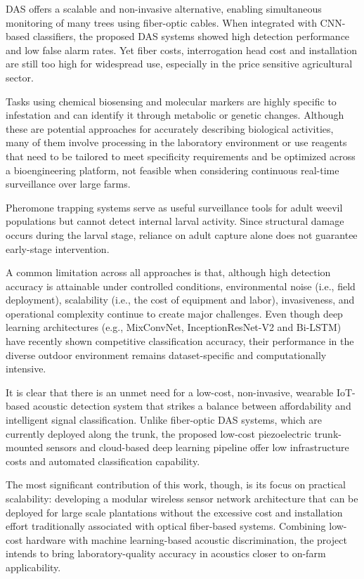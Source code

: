 \documentclass[12pt,a4paper,oneside]{memoir}
\begin{document}
DAS offers a scalable and non-invasive alternative, enabling simultaneous monitoring of many trees using fiber-optic cables. When integrated with CNN-based classifiers, the proposed DAS systems showed high detection performance and low false alarm rates. Yet fiber costs, interrogation head cost and installation are still too high for widespread use, especially in the price sensitive agricultural sector.

Tasks using chemical biosensing and molecular markers are highly specific to infestation and can identify it through metabolic or genetic changes. Although these are potential approaches for accurately describing biological activities, many of them involve processing in the laboratory environment or use reagents that need to be tailored to meet specificity requirements and be optimized across a bioengineering platform, not feasible when considering continuous real-time surveillance over large farms.

Pheromone trapping systems serve as useful surveillance tools for adult weevil populations but cannot detect internal larval activity. Since structural damage occurs during the larval stage, reliance on adult capture alone does not guarantee early-stage intervention.

A common limitation across all approaches is that, although high detection accuracy is attainable under controlled conditions, environmental noise (i.e., field deployment), scalability (i.e., the cost of equipment and labor), invasiveness, and operational complexity continue to create major challenges. Even though deep learning architectures (e.g., MixConvNet, InceptionResNet-V2 and Bi-LSTM) have recently shown competitive classification accuracy, their performance in the diverse outdoor environment remains dataset-specific and computationally intensive.

It is clear that there is an unmet need for a low-cost, non-invasive, wearable IoT-based acoustic detection system that strikes a balance between affordability and intelligent signal classification. Unlike fiber-optic DAS systems, which are currently deployed along the trunk, the proposed low-cost piezoelectric trunk-mounted sensors and cloud-based deep learning pipeline offer low infrastructure costs and automated classification capability.

The most significant contribution of this work, though, is its focus on practical scalability: developing a modular wireless sensor network architecture that can be deployed for large scale plantations without the excessive cost and installation effort traditionally associated with optical fiber-based systems. Combining low-cost hardware with machine learning-based acoustic discrimination, the project intends to bring laboratory-quality accuracy in acoustics closer to on-farm applicability.
\end{document}
